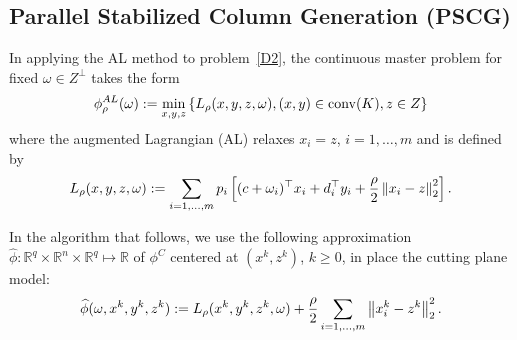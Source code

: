 \subsection{Parallel Stabilized Column Generation (PSCG)}

In applying the AL method to problem~\eqref{D2}, 
the continuous master problem for fixed $\omega \in Z^\perp$ takes the form
\begin{equation}\label{EqQMPConv}
\phi_\rho^{AL}(\omega):=\min_{x,y,z} \left\{ L_\rho(x,y,z,\omega), (x,y) \in \operatorname{conv}(K), z \in Z \right \}
\end{equation}
where the augmented Lagrangian (AL) relaxes $x_i=z$, $i=1,\dots,m$ and is defined by
\begin{equation}\label{ALDefn}
L_\rho(x,y,z,\omega):= \sum_{i=1,\dots,m} p_i\left[ (c+\omega_i)^\top x_i + d_i^\top y_i + \frac{\rho}{2}\left \| x_i-z \right \|_2^2 \right].
\end{equation}







In the algorithm that follows, we use the following approximation $\widehat{\phi} : \mathbb{R}^q \times \mathbb{R}^n \times \mathbb{R}^q \mapsto \mathbb{R}$ of $\phi^C$ centered at $(x^k,z^k)$, $k \ge 0$, in place the cutting plane model:
\begin{align*}
\widehat{\phi}(\omega,x^k,y^k, z^k) := L_\rho(x^k,y^k,z^k,\omega) + \frac{\rho}{2} \sum_{i=1,\dots,m}\left \| x_i^k-z^k \right \|_2^2.
\end{align*}




